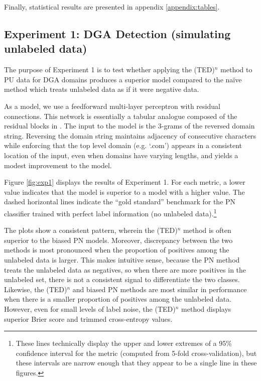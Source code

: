 \documentclass[conference]{IEEEtran}
\begin{document}
    Finally, statistical results are presented in appendix \ref{appendix:tables}.

\subsection{Experiment 1: DGA Detection (simulating unlabeled data)}

    The purpose of Experiment 1 is to test whether applying the (TED)${}^n$ method to PU data for DGA domains produces a superior model compared to the na{\"i}ve method which treats unlabeled data as if it were negative data. 

    As a model, we use a feedforward multi-layer perceptron with residual connections. This network is essentially a tabular analogue composed of the residual blocks in \cite{he-2016}. The input to the model is the 3-grams of the reversed domain string. Reversing the domain string maintains adjacency of consecutive characters while enforcing that the top level domain (e.g. `.com') appears in a consistent location of the input, even when domains have varying lengths, and yields a modest improvement to the model.

    Figure \ref{fig:exp1} displays the results of Experiment 1. For each metric, a lower value indicates that the model is superior to a model with a higher value. The dashed horizontal lines indicate the ``gold standard'' benchmark for the PN classifier trained with perfect label information (no unlabeled data).\footnote{These lines technically display the upper and lower extremes of a 95\% confidence interval for the metric (computed from 5-fold cross-validation), but these intervals are narrow enough that they appear to be a single line in these figures.}

    The plots show a consistent pattern, wherein the (TED)${}^n$ method is often superior to the biased PN models. Moreover, discrepancy between the two methods is most pronounced when the proportion of positives among the unlabeled data is larger. This makes intuitive sense, because the PN method treats the unlabeled data as negatives, so when there are more positives in the unlabeled set, there is not a consistent signal to differentiate the two classes. Likewise, the (TED)${}^n$ and biased PN methods are most similar in performance when there is a smaller proportion of positives among the unlabeled data. However, even for small levels of label noise, the (TED)${}^n$ method displays superior Brier score and trimmed cross-entropy values. 
\end{document}
